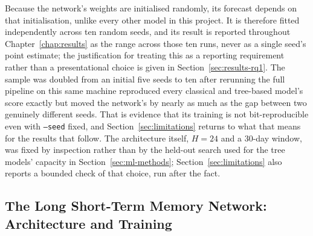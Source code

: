 \documentclass[12pt,a4paper]{report}
\begin{document}
Because the network's weights are initialised randomly, its forecast depends
on that initialisation, unlike every other model in this project. It is
therefore fitted independently across ten random seeds, and its result is
reported throughout Chapter~\ref{chap:results} as the range across those
ten runs, never as a single seed's point estimate; the justification for
treating this as a reporting requirement rather than a presentational choice
is given in Section~\ref{sec:results-rq1}. The sample was doubled from an
initial five seeds to ten after rerunning the full pipeline on this same
machine reproduced every classical and tree-based model's score exactly but
moved the network's by nearly as much as the gap between two genuinely
different seeds. That is evidence that its training is not bit-reproducible
even with \texttt{--seed} fixed, and Section~\ref{sec:limitations} returns to
what that means for the results that follow. The architecture itself, $H=24$
and a 30-day window, was fixed by inspection rather than by the held-out
search used for the tree models' capacity in Section~\ref{sec:ml-methods};
Section~\ref{sec:limitations} also reports a bounded check of that choice,
run after the fact.

\subsection{The Long Short-Term Memory Network: Architecture and Training}
\label{sec:lstm}
\end{document}
